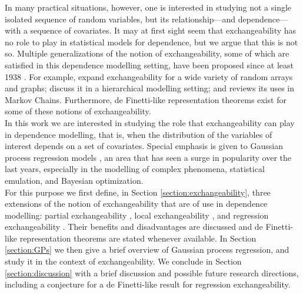 In many practical situations, however, one is interested in studying not a single isolated sequence of random variables, but its relationship---and dependence---with a sequence of covariates. It may at first sight seem that exchangeability has no role to play in statistical models for dependence, but we argue that this is not so. Multiple generalizations of the notion of exchangeability, some of which are satisfied in this dependence modelling setting, have been proposed since at least 1938 \cite{deFinetti:1938:partial_exch}. For example, \cite{Aldous:2010, Orbanz:Roy:2015} expand exchangeability for a wide variety of random arrays and graphs; \cite{Bernardo:1996:Exch, CamerlenghiEtAl:2019:partial_exchang_hierarchical} discuss it in a hierarchical modelling setting; and \cite{Diaconis:1988:PartialExchang} reviews its uses in Markov Chains. Furthermore, de Finetti-like representation theorems exist for some of these notions of exchangeability. 
\\


In this work we are interested in studying the role that exchangeability can play in dependence modelling, that is, when the distribution of the variables of interest depends on a set of covariates. Special emphasis is given to Gaussian process regression models \cite{RasmussenWilliams:2006}, an area that has seen a surge in popularity over the last years, especially in the modelling of complex phenomena, statistical emulation, and Bayesian optimization.
\\


For this purpose we first define, in Section \ref{section:exchangeability}, three extensions of the notion of exchangeability that are of use in dependence modelling: partial exchangeability \cite{deFinetti:1938:partial_exch}, local exchangeability \cite{CampbellEtAl:2019:LocalExch}, and regression exchangeability \cite{McCullagh:2005:ExchAndReg}. Their benefits and disadvantages are discussed and de Finetti-like representation theorems are stated whenever available. In Section \ref{section:GPs} we then give a brief overview of Gaussian process regression, and study it in the context of exchangeability. We conclude in Section \ref{section:discussion} with a brief discussion and possible future research directions, including a conjecture for a de Finetti-like result for regression exchangeability.





